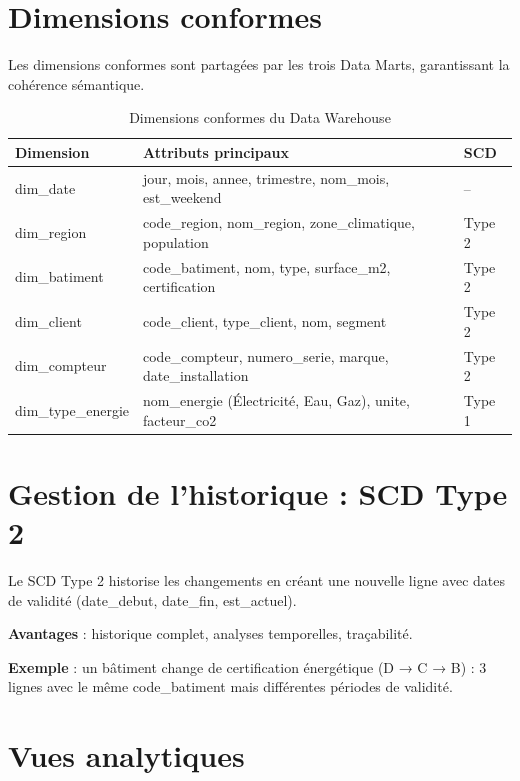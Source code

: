 \documentclass[12pt,a4paper]{report}
\begin{document}
\section{Dimensions conformes}

Les dimensions conformes sont partagées par les trois Data Marts, garantissant la cohérence sémantique.

\begin{table}[H]
\centering
\caption{Dimensions conformes du Data Warehouse}
\label{tab:dimensions_conformes}
\small
\begin{tabular}{|l|p{5cm}|l|}
\hline
\textbf{Dimension} & \textbf{Attributs principaux} & \textbf{SCD} \\
\hline
dim\_date & jour, mois, annee, trimestre, nom\_mois, est\_weekend & -- \\
\hline
dim\_region & code\_region, nom\_region, zone\_climatique, population & Type 2 \\
\hline
dim\_batiment & code\_batiment, nom, type, surface\_m2, certification & Type 2 \\
\hline
dim\_client & code\_client, type\_client, nom, segment & Type 2 \\
\hline
dim\_compteur & code\_compteur, numero\_serie, marque, date\_installation & Type 2 \\
\hline
dim\_type\_energie & nom\_energie (Électricité, Eau, Gaz), unite, facteur\_co2 & Type 1 \\
\hline
\end{tabular}
\end{table}

\section{Gestion de l'historique : SCD Type 2}

Le SCD Type 2 historise les changements en créant une nouvelle ligne avec dates de validité (date\_debut, date\_fin, est\_actuel).

\textbf{Avantages} : historique complet, analyses temporelles, traçabilité.

\textbf{Exemple} : un bâtiment change de certification énergétique (D → C → B) : 3 lignes avec le même code\_batiment mais différentes périodes de validité.

\section{Vues analytiques}
\end{document}
